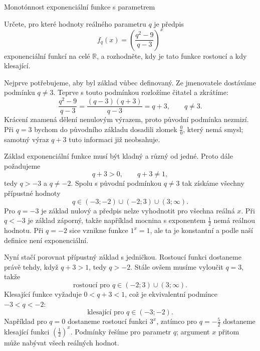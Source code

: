 \documentclass[12pt,a4paper]{article}
\begin{document}
\begin{examplebox}{Monotónnost exponenciální funkce s parametrem}

Určete, pro které hodnoty reálného parametru $q$ je předpis
\[
    f_q(x)=\left(\frac{q^2-9}{q-3}\right)^x
\]
exponenciální funkcí na celé $\mathbb{R}$, a rozhodněte, kdy je tato funkce rostoucí a kdy klesající.

Nejprve potřebujeme, aby byl základ vůbec definovaný.
Ze jmenovatele dostáváme podmínku $q\neq3$.
Teprve s touto podmínkou rozložíme čitatel a zkrátíme:
\[
    \frac{q^2-9}{q-3}
    =\frac{(q-3)(q+3)}{q-3}
    =q+3,\qquad q\neq3.
\]
Krácení znamená dělení nenulovým výrazem, proto původní podmínka nezmizí.
Při $q=3$ bychom do původního základu dosadili zlomek $\frac00$, který nemá smysl;
samotný výraz $q+3$ tuto informaci již neobsahuje.

Základ exponenciální funkce musí být kladný a různý od jedné.
Proto dále požadujeme
\[
    q+3>0,\qquad q+3\neq1,
\]
tedy $q>-3$ a $q\neq-2$.
Spolu s původní podmínkou $q\neq3$ tak získáme všechny přípustné hodnoty
\[
    q\in(-3;-2)\cup(-2;3)\cup(3;\infty).
\]
Pro $q=-3$ je základ nulový a předpis nelze vyhodnotit pro všechna reálná $x$.
Při $q<-3$ je základ záporný, takže například mocnina s exponentem $\frac12$ nemá reálnou hodnotu.
Při $q=-2$ sice vznikne funkce $1^x=1$, ale ta je konstantní a podle naší definice není exponenciální.

Nyní stačí porovnat přípustný základ s jedničkou.
Rostoucí funkci dostaneme právě tehdy, když $q+3>1$, tedy $q>-2$.
Stále ovšem musíme vyloučit $q=3$, takže
\[
    \text{rostoucí pro }q\in(-2;3)\cup(3;\infty).
\]
Klesající funkce vyžaduje $0<q+3<1$, což je ekvivalentní podmínce $-3<q<-2$:
\[
    \text{klesající pro }q\in(-3;-2).
\]
Například pro $q=0$ dostaneme rostoucí funkci $3^x$,
zatímco pro $q=-\frac52$ dostaneme klesající funkci $\left(\frac12\right)^x$.
Podmínky řešíme pro parametr $q$; argument $x$ přitom může nabývat všech reálných hodnot.
\end{examplebox}
\end{document}
